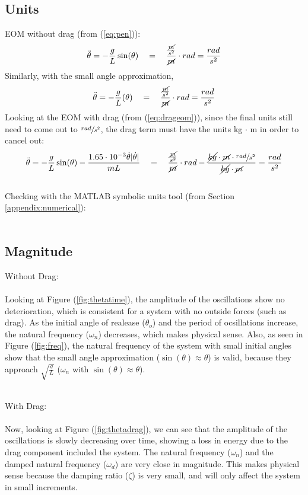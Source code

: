\documentclass[12pt]{report}
\begin{document}
\begin{flushleft}
\subsection{Units}
EOM without drag (from (\ref{eq:pen})):
$$
\ddot{\theta} = -\frac{g}{L}\sin(\theta) \quad = \quad
\frac{\frac{\cancel{m}}{s^2}}{\cancel{m}}\cdot rad = \frac{rad}{s^2}
$$
Similarly, with the small angle approximation,
$$
\ddot{\theta} = -\frac{g}{L}(\theta) \quad = \quad
\frac{\frac{\cancel{m}}{s^2}}{\cancel{m}}\cdot rad = \frac{rad}{s^2}
$$
Looking at the EOM with drag (from (\ref{eq:drageom})), since the final units still need to come out to $\sfrac{rad}{s^2}$, the drag term must have the units kg $\cdot$ m in order to cancel out: \\
$$
\ddot{\theta} = -\frac{g}{L}\sin(\theta) - \frac{1.65 \cdot 10^{-3}\dot{\theta}|\dot{\theta}|}{mL} \quad = \quad
\frac{\frac{\cancel{m}}{s^2}}{\cancel{m}} \cdot rad - \frac{\cancel{kg} \cdot \cancel{m}\cdot \sfrac{rad}{s^2}}{\cancel{kg}\cdot\cancel{m}}
=
\frac{rad}{s^2}
$$
~\\
Checking with the MATLAB symbolic units tool (from Section \ref{appendix:numerical}): \\
~\\
% 
\newpage
\subsection{Magnitude}
Without Drag: \\
~\\
Looking at Figure (\ref{fig:thetatime}), the amplitude of the oscillations show no
deterioration, which is consistent for a system with no outside forces (such as drag).
As the initial angle of realease ($\theta_o$) and the period of ocsillations increase, the
natural frequency ($\omega_n$) decreases, which makes physical sense. Also, as seen in
Figure (\ref{fig:freq}), the natural frequency of the system with small initial angles
show that the small angle approximation ($\sin(\theta) \approx \theta$) is valid,
because they approach $\sqrt{\frac{g}{L}}$ ($\omega_n$ with $\sin(\theta) \approx \theta$).

~\\
With Drag: \\
~\\
Now, looking at Figure (\ref{fig:thetadrag}), we can see that the amplitude of the
oscillations is slowly decreasing over time, showing a loss in energy due to the
drag component included the system. The natural frequency ($\omega_n$) and the damped
natural frequency ($\omega_d$) are very close in magnitude. This makes physical sense because
the damping ratio ($\zeta$) is very small, and will only affect the system in small increments.


\end{flushleft}
\end{document}
